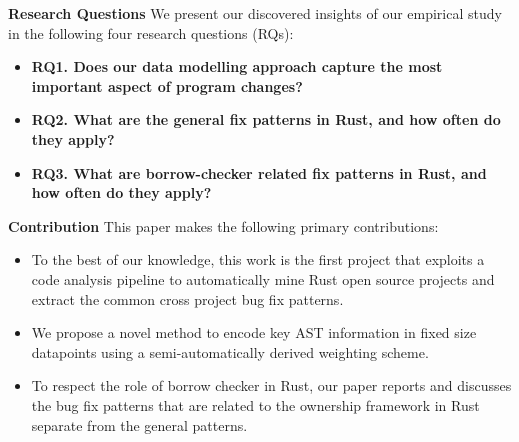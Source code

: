 \noindent \textbf{Research Questions} We present our discovered insights of our empirical study in the following four research
questions (RQs):

\begin{itemize}
    \item \textbf{RQ1. Does our data modelling approach capture the most important aspect of program changes?} 
    \item \textbf{RQ2. What are the general fix patterns in Rust, and how often do they apply?} 
    \item \textbf{RQ3. What are borrow-checker related fix patterns in Rust, and how often do they apply?}
\end{itemize}



\noindent \textbf{Contribution} This paper makes the following primary contributions:

\begin{itemize}
    \item To the best of our knowledge, this work is the first project that exploits a code analysis pipeline to automatically mine Rust open source projects and extract the common cross project bug fix patterns.
    \item We propose a novel method to encode key AST information in fixed size datapoints using a semi-automatically derived weighting scheme.
    \item To respect the role of borrow checker in Rust, our paper reports and discusses the bug fix patterns that are related to the ownership framework in Rust separate from the general patterns.
\end{itemize}


